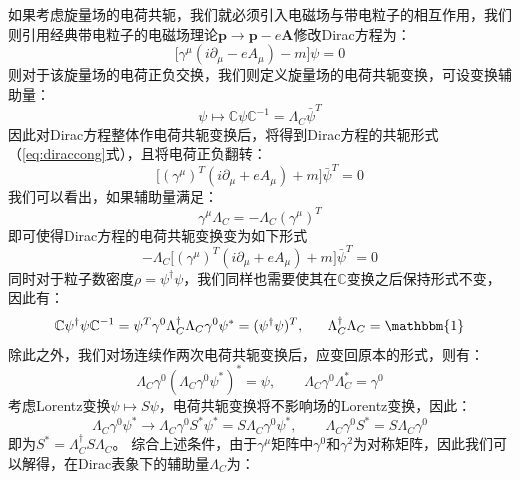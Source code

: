 如果考虑旋量场的电荷共轭，我们就必须引入电磁场与带电粒子的相互作用，我们则引用经典带电粒子的电磁场理论$\boldsymbol{p}\rightarrow\boldsymbol{p}-e\boldsymbol{A}$修改Dirac方程为：
\begin{equation}
\Big[\gamma^\mu(i\partial_\mu-eA_\mu)-m\Big]\psi=0
\end{equation}
则对于该旋量场的电荷正负交换，我们则定义旋量场的电荷共轭变换，可设变换辅助量：
\begin{equation}
    \psi\mapsto\mathbb{C}\psi\mathbb{C}^{-1}=\Lambda_C\bar{\psi}^T
\end{equation}
因此对Dirac方程整体作电荷共轭变换后，将得到Dirac方程的共轭形式（\eqref{eq:diraccong}式），且将电荷正负翻转：
\begin{equation}
\Big[(\gamma^\mu)^T(i\partial_\mu+eA_\mu)+m\Big]\bar{\psi}^T=0
\end{equation}
我们可以看出，如果辅助量满足：
\begin{equation}
\gamma^\mu\Lambda_C =-\Lambda_C({\gamma^\mu})^T
\end{equation}
即可使得Dirac方程的电荷共轭变换变为如下形式
\begin{equation}
    -\Lambda_C \Big[({\gamma^\mu})^T(i\partial_\mu+eA_\mu)+m\Big]\bar{\psi}^T=0
\end{equation}
同时对于粒子数密度$\rho=\psi^\dagger\psi$，我们同样也需要使其在$\mathbb{C}$变换之后保持形式不变，因此有：
\begin{equation}
\mathbb{C}{\psi}^\dagger\psi\mathbb{C}^{-1}=\psi^T\gamma^0 \Lambda_C^\dagger \Lambda_C\gamma^0 \psi^* = (\psi^\dagger\psi)^T,~~~~~\Lambda_C^\dagger\Lambda_C =\mathbbm{1}
\end{equation}
除此之外，我们对场连续作两次电荷共轭变换后，应变回原本的形式，则有：
\begin{equation}
\Lambda_C\gamma^0(\Lambda_C\gamma^0\psi^*)^*=\psi,\qquad \Lambda_C \gamma^0 \Lambda_C^*=\gamma^0
\end{equation}
考虑Lorentz变换$\psi\mapsto S\psi$，电荷共轭变换将不影响场的Lorentz变换，因此：
\begin{equation}
\Lambda_C\gamma^0\psi^*\rightarrow \Lambda_C\gamma^0S^*\psi^*=S \Lambda_C\gamma^0\psi^*, \qquad \Lambda_C\gamma^0S^*=S\Lambda_C\gamma^0
\end{equation}
即为$S^*=\Lambda_C^\dagger S\Lambda_C$。
综合上述条件，由于$\gamma^\mu$矩阵中$\gamma^0$和$\gamma^2$为对称矩阵，因此我们可以解得，在Dirac表象下的辅助量$\Lambda_C$为：
